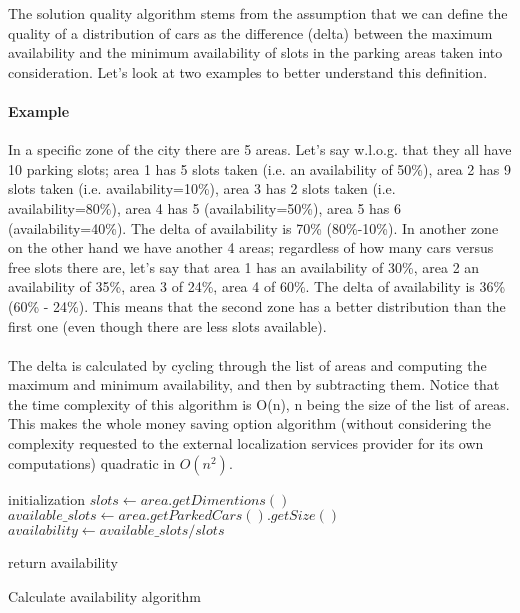 The solution quality algorithm stems from the assumption that we can define the quality of a distribution of cars as the difference (delta) between the maximum availability and the minimum availability of slots in the parking areas taken into consideration. Let's look at two examples to better understand this definition.
\paragraph{Example}In a specific zone of the city there are 5 areas. Let's say w.l.o.g. that they all have 10 parking slots; area 1 has 5 slots taken (i.e. an availability of 50\%), area 2 has 9 slots taken (i.e. availability=10\%), area 3 has 2 slots taken (i.e. availability=80\%), area 4 has 5 (availability=50\%), area 5 has 6 (availability=40\%). The delta of availability is 70\% (80\%-10\%).
In another zone on the other hand we have another 4 areas; regardless of how many cars versus free slots there are, let's say that area 1 has an availability of 30\%, area 2 an availability of 35\%, area 3 of 24\%, area 4 of 60\%. The delta of availability is 36\% (60\% - 24\%). This means that the second zone has a better distribution than the first one (even though there are less slots available).
\paragraph{}The delta is calculated by cycling through the list of areas and computing the maximum and minimum availability, and then by subtracting them. Notice that the time complexity of this algorithm is O(n), n being the size of the list of areas. This makes the whole money saving option algorithm (without considering the complexity requested to the external localization services provider for its own computations) quadratic in $O(n^2)$.

\begin{algorithm}
	initialization\;
	$slots \leftarrow area.getDimentions()$\;
	$available\_slots \leftarrow area.getParkedCars().getSize()$\;
	$availability \leftarrow available\_slots / slots$\;
	
	return availability\;
	\caption{Calculate availability algorithm}
\end{algorithm}


